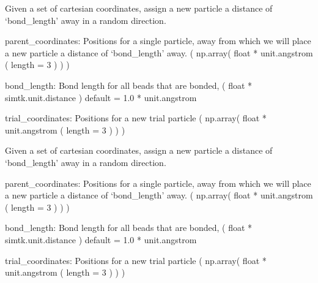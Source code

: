 \documentclass[letterpaper,12pt,english,openany,oneside]{sphinxmanual}
\begin{document}
\begin{fulllineitems}
\label{\detokenize{utilities:utilities.util.attempt_lattice_move}}
Given a set of cartesian coordinates, assign a new particle
a distance of ‘bond\_length’ away in a random direction.

parent\_coordinates: Positions for a single particle,
away from which we will place a new particle a distance
of ‘bond\_length’ away.
( np.array( float * unit.angstrom ( length = 3 ) ) )

bond\_length: Bond length for all beads that are bonded,
( float * simtk.unit.distance )
default = 1.0 * unit.angstrom

trial\_coordinates: Positions for a new trial particle
( np.array( float * unit.angstrom ( length = 3 ) ) )

\end{fulllineitems}


\begin{fulllineitems}
\label{\detokenize{utilities:utilities.util.attempt_move}}
Given a set of cartesian coordinates, assign a new particle
a distance of ‘bond\_length’ away in a random direction.

parent\_coordinates: Positions for a single particle,
away from which we will place a new particle a distance
of ‘bond\_length’ away.
( np.array( float * unit.angstrom ( length = 3 ) ) )

bond\_length: Bond length for all beads that are bonded,
( float * simtk.unit.distance )
default = 1.0 * unit.angstrom

trial\_coordinates: Positions for a new trial particle
( np.array( float * unit.angstrom ( length = 3 ) ) )

\end{fulllineitems}

\end{document}
